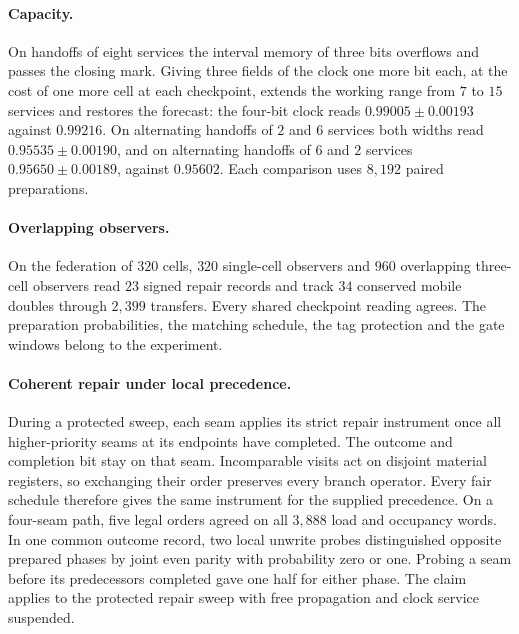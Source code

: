 \documentclass[11pt]{article}
\theoremstyle{definition}
\theoremstyle{remark}
\theoremstyle{plain}
\begin{document}
\paragraph{Capacity.}
On handoffs of eight services the interval memory of three bits overflows
and passes the closing mark. Giving three fields of the clock one more bit
each, at the cost of one more cell at each checkpoint, extends the working
range from $7$ to $15$ services and restores the forecast: the four-bit
clock reads $0.99005\pm0.00193$ against $0.99216$. On alternating handoffs
of $2$ and $6$ services both widths read $0.95535\pm0.00190$, and on
alternating handoffs of $6$ and $2$ services $0.95650\pm0.00189$, against
$0.95602$. Each comparison uses $8{,}192$ paired preparations.

\paragraph{Overlapping observers.}
On the federation of $320$ cells, $320$ single-cell observers and $960$
overlapping three-cell observers read $23$ signed repair records and track
$34$ conserved mobile doubles through $2{,}399$ transfers. Every shared
checkpoint reading agrees. The preparation probabilities, the matching
schedule, the tag protection and the gate windows belong to the
experiment.

\paragraph{Coherent repair under local precedence.}
During a protected sweep, each seam applies its strict repair instrument
once all higher-priority seams at its endpoints have completed. The
outcome and completion bit stay on that seam. Incomparable visits act on
disjoint material registers, so exchanging their order preserves every
branch operator. Every fair schedule therefore gives the same instrument
for the supplied precedence. On a four-seam path, five legal orders
agreed on all $3{,}888$ load and occupancy words. In one common outcome
record, two local unwrite probes distinguished opposite prepared phases
by joint even parity with probability zero or one. Probing a seam before
its predecessors completed gave one half for either phase. The claim
applies to the protected repair sweep with free propagation and clock
service suspended.
\end{document}
